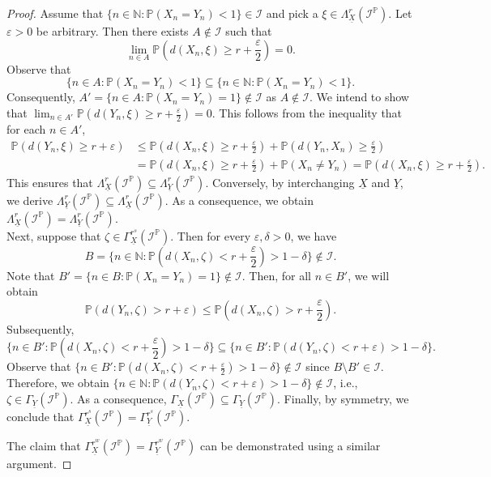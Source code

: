 \documentclass[reqno]{amsart}
\begin{document}
\begin{proof}
Assume that $\{n\in\mathbb{N}:\mathbb{P}(X_n=Y_n)<1\}\in \mathcal{I}$ and pick a $\xi\in\Lambda^r_{\underline{X}}(\mathcal{I}^{\mathbb{P}})$. Let $\varepsilon>0$ be arbitrary. Then there exists $A\notin \mathcal{I}$ such that
$$
\displaystyle\lim_{n\in A}\mathbb{P}(d(X_n,\xi)\geq r+\frac{\varepsilon}{2})=0.
$$  
Observe that $$\{n\in A:\mathbb{P}(X_n=Y_n)<1\}\subseteq \{n\in\mathbb{N}:\mathbb{P}(X_n=Y_n)<1\}.$$
Consequently, $A'=\{n\in A:\mathbb{P}(X_n=Y_n)=1\}\notin \mathcal{I}$ as $A\notin \mathcal{I}$.
 We intend to show that $\displaystyle\lim_{n\in A'}\mathbb{P}(d(Y_n,\xi)\geq r+\frac{\varepsilon}{2})=0$. This follows from the inequality that for each $n\in A'$, 
\begin{align*}
\mathbb{P}(d(Y_n,\xi)\geq r+\varepsilon)&\leq \mathbb{P}(d(X_n,\xi)\geq r+\frac{\varepsilon}{2})+\mathbb{P}(d(Y_n,X_n)\geq
\frac{\varepsilon}{2})\\
&=\mathbb{P}(d(X_n,\xi)\geq r+\frac{\varepsilon}{2})+\mathbb{P}(X_n\neq Y_n)=\mathbb{P}(d(X_n,\xi)\geq r+\frac{\varepsilon}{2}).
\end{align*}	
This ensures that $\Lambda^r_{\underline{X}}(\mathcal{I}^{\mathbb{P}})\subseteq\Lambda^r_{\underline{Y}}(\mathcal{I}^{\mathbb{P}})$. Conversely, by interchanging $\underline{X}$ and $\underline{Y}$, we derive $\Lambda^r_{\underline{Y}}(\mathcal{I}^{\mathbb{P}})\subseteq\Lambda^r_{\underline{X}}(\mathcal{I}^{\mathbb{P}})$. As a consequence, we obtain $\Lambda^r_{\underline{X}}(\mathcal{I}^{\mathbb{P}})=\Lambda^r_{\underline{Y}}(\mathcal{I}^{\mathbb{P}})$.\\

Next, suppose that $\zeta\in\Gamma^{r^s}_{\underline{X}}(\mathcal{I}^{\mathbb{P}})$. Then for every $\varepsilon,\delta>0$, we have  
$$
B=\{n\in\mathbb{N}:\mathbb{P}(d(X_n,\zeta)<r+\frac{\varepsilon}{2})>1-\delta\}\notin \mathcal{I}.
$$ Note that  $B'=\{n\in B:\mathbb{P}(X_n=Y_n)=1\}\notin \mathcal{I}$. Then, for all $n\in B'$, we will obtain  
$$
\mathbb{P}(d(Y_n,\zeta)>r+\varepsilon)\leq \mathbb{P}(d(X_n,\zeta)>r+\frac{\varepsilon}{2}).
$$ 
Subsequently,
$$
\{n\in B':\mathbb{P}(d(X_n,\zeta)<r+\frac{\varepsilon}{2})>1-\delta\}\subseteq \{n\in B':\mathbb{P}(d(Y_n,\zeta)<r+\varepsilon)>1-\delta\}.
$$
Observe that 
$\{n\in B':\mathbb{P}(d(X_n,\zeta)<r+\frac{\varepsilon}{2})>1-\delta\}\notin \mathcal{I}$
since $B\setminus B'\in\mathcal{I}$. Therefore, 
we obtain  $\{n\in\mathbb{N}:\mathbb{P}(d(Y_n,\zeta)<r+\varepsilon)>1-\delta\}\notin \mathcal{I}$, i.e., $\zeta\in\Gamma_{\underline{Y}}(\mathcal{I}^{\mathbb{P}})$. As a consequence, $\Gamma_{\underline{X}}(\mathcal{I}^{\mathbb{P}})\subseteq\Gamma_{\underline{Y}}(\mathcal{I}^{\mathbb{P}})$. Finally, by symmetry, we  conclude that $\Gamma^{r^s}_{\underline{X}}(\mathcal{I}^{\mathbb{P}})=\Gamma^{r^s}_{\underline{Y}}(\mathcal{I}^{\mathbb{P}})$.

The claim that $\Gamma^{r^w}_{\underline{X}}(\mathcal{I}^{\mathbb{P}})=\Gamma^{r^w}_{\underline{Y}}(\mathcal{I}^{\mathbb{P}})$ can be demonstrated using a similar argument.
\end{proof}
\end{document}
